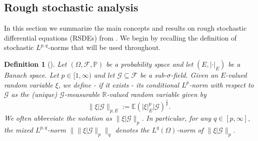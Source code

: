 \documentclass[11pt,a4paper]{article}
\newcommand{\R}{\mathbb{R}}
\newcommand{\E}{\mathbb{E}}
\newtheorem{defn}{Definition}[section]
\theoremstyle{plain}
\begin{document}
 

\subsection{Rough stochastic analysis}
In this section we summarize the main concepts and results on rough stochastic differential equations (RSDEs) from \cite{FHL21}. We begin by recalling the definition of stochastic $L^{p,q}$-norms that will be used throughout.

\begin{defn}[] Let $(\Omega,\mathcal{F},\mathbb{P})$ be a probability space and let $(E,|\cdot|_E)$ be a Banach space. Let $p \in [1,\infty)$ and let $\mathcal{G}\subseteq\mathcal{F}$ be a sub-$\sigma$-field. Given  an $E$-valued random variable $\xi$, we define - if it exists - its conditional $L^p$-norm with respect to  $\mathcal{G}$ as the (unique) $\mathcal{G}$-measurable $\R$-valued random variable given by \begin{equation*}
    \|\xi|\mathcal{G}\|_{p;E} := \E\left(|\xi|_E^p|\mathcal{G}\right)^{\frac{1}{p}}.
\end{equation*} 
We often abbreviate the notation as $\|\xi|\mathcal{G}\|_p$.  
In particular, for any $q\in[p,\infty]$, the mixed $L^{p,q}$-norm $\|\|\xi |\mathcal{G}\|_p\|_q$ denotes the $L^q(\Omega)$-norm of $\|\xi|\mathcal{G}\|_p$.
\end{defn}
\end{document}
